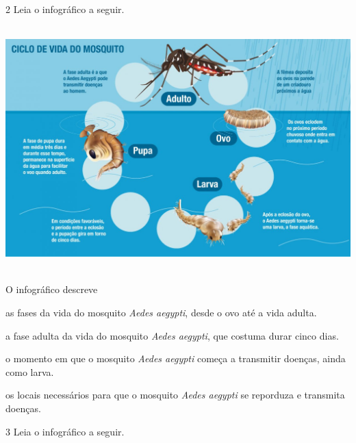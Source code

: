 \num{2} Leia o infográfico a seguir.

\includegraphics[width=5.90556in,height=3.72118in]{media/image37.jpeg}


O infográfico descreve

\begin{escolha}
\item as fases da vida do mosquito \emph{Aedes aegypti}, desde o ovo até a vida adulta.

\item a fase adulta da vida do mosquito \emph{Aedes aegypti}, que costuma durar cinco dias.

\item o momento em que o mosquito \emph{Aedes aegypti} começa a transmitir doenças, ainda como larva.

\item os locais necessários para que o mosquito \emph{Aedes aegypti} se reporduza e transmita doenças.
\end{escolha}

\num{3} Leia o infográfico a seguir.

